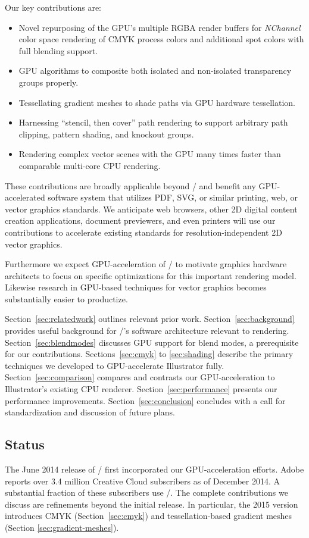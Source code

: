 Our key contributions are:
\begin{itemize}

\item Novel repurposing of the GPU's multiple RGBA render buffers for {\em NChannel} color space rendering of CMYK process colors and additional spot colors with full blending support.

\item GPU algorithms to composite both isolated and non-isolated transparency groups properly.

\item Tessellating gradient meshes to shade paths via GPU hardware tessellation.

\item Harnessing ``stencil, then cover'' path rendering to support arbitrary path clipping, pattern shading, and knockout groups.

\item Rendering complex vector scenes with the GPU many times faster than comparable multi-core CPU rendering.

\end{itemize}
These contributions are broadly applicable beyond \Illustrator/ and benefit
any GPU-accelerated software system that
utilizes PDF, SVG, or similar printing, web, or vector graphics standards.
We anticipate web browsers, other 2D digital content creation applications,
document previewers, and even printers will use our contributions
to accelerate existing standards for resolution-independent 2D vector graphics.

Furthermore we expect GPU-acceleration of \Illustrator/ to motivate graphics hardware architects
to focus on specific optimizations for this important rendering model.  Likewise research in GPU-based  techniques for vector
graphics becomes substantially easier to productize.

Section~\ref{sec:relatedwork} outlines relevant prior work.  Section~\ref{sec:background} provides useful background for \Illustrator/'s
software architecture relevant to rendering. 
Section~\ref{sec:blendmodes} discusses GPU support for blend modes, a prerequisite for our contributions.
Sections~\ref{sec:cmyk} to \ref{sec:shading} describe the primary techniques we developed
to GPU-accelerate Illustrator fully.  Section~\ref{sec:comparison} compares and contrasts our GPU-acceleration to Illustrator's existing CPU renderer.   Section~\ref{sec:performance} presents our performance improvements.  Section~\ref{sec:conclusion} concludes
with a call for standardization and discussion of future plans.

\subsection{Status}

The June 2014 release of \AdobeIllustratorCC/ first incorporated our
GPU-acceleration efforts.  Adobe reports over 3.4 million Creative
Cloud subscribers as of December 2014.  A substantial fraction of
these subscribers use \Illustrator/.
The complete
contributions we discuss are refinements beyond the initial release.
In particular, the 2015 version introduces CMYK
(Section~\ref{sec:cmyk}) and tessellation-based gradient meshes (Section
\ref{sec:gradient-meshes}).
